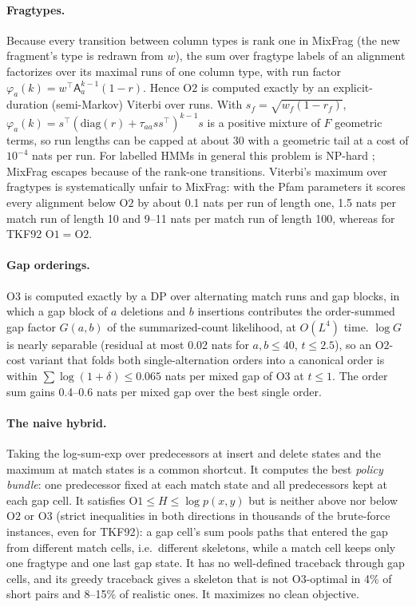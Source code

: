 \documentclass[11pt]{article}
\begin{document}
\paragraph{Fragtypes.} Because every transition between column types is rank
one in MixFrag (the new fragment's type is redrawn from $w$), the sum over
fragtype labels of an alignment factorizes over its maximal runs of one column
type, with run factor $\varphi_a(k)=w^\top\mathsf A_a^{k-1}(1-r)$. Hence
$\mathrm{O2}$ is computed exactly by an explicit-duration (semi-Markov) Viterbi
over runs. With $s_f=\sqrt{w_f(1-r_f)}$, $\varphi_a(k)=s^\top(\mathrm{diag}(r)
+\tau_{aa}ss^\top)^{k-1}s$ is a positive mixture of $F$ geometric terms, so run
lengths can be capped at about 30 with a geometric tail at a cost of
$10^{-4}$ nats per run. For labelled HMMs in general this problem is NP-hard
\citep{LyngsoPedersen2002,Brejova2007}; MixFrag escapes because of the rank-one
transitions. Viterbi's maximum over fragtypes is systematically unfair to
MixFrag: with the Pfam parameters it scores every alignment below
$\mathrm{O2}$ by about 0.1 nats per run of length one, 1.5 nats per match run of
length 10 and 9--11 nats per match run of length 100, whereas for TKF92
$\mathrm{O1}=\mathrm{O2}$.

\paragraph{Gap orderings.} $\mathrm{O3}$ is computed exactly by a DP over
alternating match runs and gap blocks, in which a gap block of $a$ deletions and
$b$ insertions contributes the order-summed gap factor $G(a,b)$ of the
summarized-count likelihood, at $O(L^4)$ time. $\log G$ is nearly separable
(residual at most 0.02 nats for $a,b\le40$, $t\le2.5$), so an $\mathrm{O2}$-cost
variant that folds both single-alternation orders into a canonical order is
within $\sum\log(1+\delta)\le0.065$ nats per mixed gap of $\mathrm{O3}$ at
$t\le1$. The order sum gains 0.4--0.6 nats per mixed gap over the best single
order.

\paragraph{The naive hybrid.} Taking the log-sum-exp over predecessors at insert
and delete states and the maximum at match states is a common shortcut. It
computes the best \emph{policy bundle}: one predecessor fixed at each match
state and all predecessors kept at each gap cell. It satisfies
$\mathrm{O1}\le H\le\log p(x,y)$ but is neither above nor below $\mathrm{O2}$ or
$\mathrm{O3}$ (strict inequalities in both directions in thousands of the
brute-force instances, even for TKF92): a gap cell's sum pools paths that entered
the gap from different match cells, i.e.\ different skeletons, while a match
cell keeps only one fragtype and one last gap state. It has no well-defined
traceback through gap cells, and its greedy traceback gives a skeleton that is
not $\mathrm{O3}$-optimal in 4\% of short pairs and 8--15\% of realistic ones.
It maximizes no clean objective.
\end{document}

